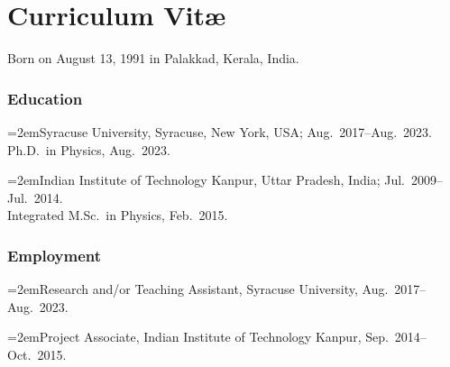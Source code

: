 
\chapter*{Curriculum Vit\ae}
\thispagestyle{empty}

\def\hangpar{\noindent\hangindent=2em}

Born on August 13, 1991 in Palakkad, Kerala, India.

\subsection*{Education}

\hangpar Syracuse University, Syracuse, New York, USA; Aug.~2017--Aug.~2023.\\
Ph.D.~in Physics, Aug.~2023.

\hangpar Indian Institute of Technology Kanpur, Uttar Pradesh, India; Jul.~2009--Jul.~2014.\\
Integrated M.Sc.~in Physics, Feb.~2015.

\subsection*{Employment}

\hangpar Research and/or Teaching Assistant, Syracuse University, Aug.~2017--Aug.~2023.

\hangpar Project Associate, Indian Institute of Technology Kanpur, Sep.~2014--Oct.~2015.
